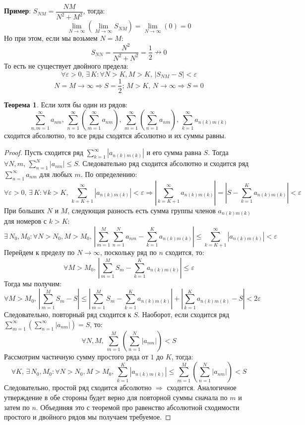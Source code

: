 \documentclass[12pt]{article}
\newcommand{\VE}{\varepsilon}
\theoremstyle{definition}
\newtheorem{theorem}{Теорема}
\newcommand{\ddsum}[2]{\displaystyle\sum\limits_{#1}^{#2}}
\begin{document}
\textbf{Пример}: $S_{NM} = \dfrac{NM}{N^2 + M^2}$, тогда:
$$
	\lim\limits_{N \to \infty}\left(\lim\limits_{M \to \infty} S_{NM}\right) = \lim\limits_{N \to \infty}\left(0\right) = 0
$$
Но при этом, если мы возьмем $N = M$:
$$
	S_{NN} = \dfrac{N^2}{N^2 + N^2} = \dfrac{1}{2} \nrightarrow 0
$$
То есть не существует двойного предела:
$$
	\forall \VE > 0, \, \exists \, K \colon \forall N > K, M > K, \, |S_{NM} - S| < \VE
$$
$$
	N = M \to \infty \Rightarrow S = \dfrac{1}{2}; \, M > K, \, N \to \infty \Rightarrow S = 0
$$
\begin{theorem}
	Если хотя бы один из рядов:
	$$
		\ddsum{n,m = 1}{\infty}a_{nm},\, \ddsum{n = 1}{\infty}\left(\ddsum{m = 1}{\infty}a_{nm}\right), \, \ddsum{m = 1}{\infty}\left(\ddsum{n = 1}{\infty}a_{nm}\right), \, \ddsum{k = 1}{\infty}a_{n(k)m(k)}
	$$
	сходится абсолютно, то все ряды сходятся абсолютно и их суммы равны.
\end{theorem}
\begin{proof}
	Пусть сходится ряд $\ddsum{k = 1}{\infty}|a_{n(k)m(k)}|$ и его сумма равна $S$. Тогда $\forall N ,m, \, \ddsum{n = 1}{N}|a_{nm}|\leq S$. Следовательно ряд сходится абсолютно и сходится ряд $\ddsum{n = 1}{\infty}a_{nm}$ для любых $m$. По определению:
	$$
		\forall \VE > 0 ,\, \exists \, K \colon \forall k > K, \, \ddsum{k = K + 1}{\infty}|a_{n(k)m(k)}| < \VE \Rightarrow \left|\ddsum{k = K + 1}{\infty}a_{n(k)m(k)}\right| = \left|S - \ddsum{k =  1}{K}a_{n(k)m(k)} \right| < \VE
	$$
	При больших $N$ и $M$, следующая разность есть сумма группы членов $a_{n(k)m(k)}$ для номеров с $k > K$:
	$$
		\exists \, N_0, M_0 \colon \forall N > N_0, M > M_0, \, \left|\ddsum{m = 1}{M}\ddsum{n = 1}{N}a_{nm} - \ddsum{k = 1}{K}a_{n(k)m(k)}\right| \leq \ddsum{k = K + 1}{\infty}|a_{n(k)m(k)}| < \VE
	$$
	Перейдем к пределу по $N \to \infty$, поскольку ряд по $n$ сходится, то:
	$$
		\forall M > M_0, \, \left|\ddsum{m = 1}{M}S_m - \ddsum{k = 1}{K}a_{n(k)m(k)}\right| \leq \VE 
	$$
	Тогда мы получим:
	$$
		\forall M > M_0, \,\left|\ddsum{m = 1}{M}S_m - S\right| \leq \left|\ddsum{m = 1}{M}S_m - \ddsum{k = 1}{K}a_{n(k)m(k)}\right|  + \left| \ddsum{k =  1}{K}a_{n(k)m(k)} - S \right| < 2\VE
	$$
	Следовательно, повторный ряд сходится к $S$. Наоборот, если сходится ряд  $\ddsum{m = 1}{\infty}\left(\ddsum{n = 1}{\infty}|a_{nm}|\right) =S$, то:
	$$
		\forall N, M, \, \ddsum{m = 1}{M}\left(\ddsum{n = 1}{N}|a_{nm}|\right) < S
	$$
	Рассмотрим частичную сумму простого ряда от $1$ до $K$, тогда:
	$$
		\forall K, \, \exists \, N_0, M_0 \colon \forall N > N_0, M > M_0, \, \ddsum{k = 1}{K}|a_{n(k)m(k)}| \leq \ddsum{m = 1}{M}\left(\ddsum{n = 1}{N}|a_{nm}|\right) < S
	$$
	Следовательно, простой ряд сходится абсолютно $\Rightarrow$ сходится. Аналогичное утверждение в обе стороны будет верно для повторной суммы сначала по $m$ и затем по $n$. Объединяя это с теоремой про равенство абсолютной сходимости простого и двойного рядов мы получаем требуемое.
\end{proof}
\end{document}

